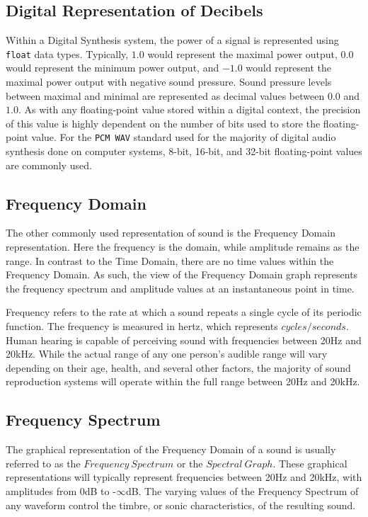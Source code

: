 \documentclass[a4paper,12pt]{report}
\begin{document}
\subsection{Digital Representation of Decibels}
\label{subsec:digitalrepdecibels}
Within a Digital Synthesis system, the power of a signal is represented using \texttt{float} data types. Typically, $1.0$ would represent the maximal power output, $0.0$ would represent the minimum power output, and $-1.0$ would represent the maximal power output with negative sound pressure. Sound pressure levels between maximal and minimal are represented as decimal values between $0.0$ and $1.0$. As with any floating-point value stored within a digital context, the precision of this value is highly dependent on the number of bits used to store the floating-point value. For the \texttt{PCM\ WAV} standard used for the majority of digital audio synthesis done on computer systems, 8-bit, 16-bit, and 32-bit floating-point values are commonly used.

\subsection{Frequency Domain}
\label{subsec:freqdomain}
The other commonly used representation of sound is the Frequency Domain representation. Here the frequency is the domain, while amplitude remains as the range. In contrast to the Time Domain, there are no time values within the Frequency Domain. As such, the view of the Frequency Domain graph represents the frequency spectrum and amplitude values at an instantaneous point in time.

Frequency refers to the rate at which a sound repeats a single cycle of its periodic function. The frequency is measured in hertz, which represents $cycles/seconds$. Human hearing is capable of perceiving sound with frequencies between 20Hz and 20kHz. While the actual range of any one person's audible range will vary depending on their age, health, and several other factors, the majority of sound reproduction systems will operate within the full range between 20Hz and 20kHz. 

\subsection{Frequency Spectrum}
\label{subsec:freqspect}
The graphical representation of the Frequency Domain of a sound is usually referred to as the $Frequency\ Spectrum$ or the $Spectral\ Graph$. These graphical representations will typically represent frequencies between 20Hz and 20kHz, with amplitudes from 0dB to -$\infty$dB. The varying values of the Frequency Spectrum of any waveform control the timbre, or sonic characteristics, of the resulting sound.
\end{document}
